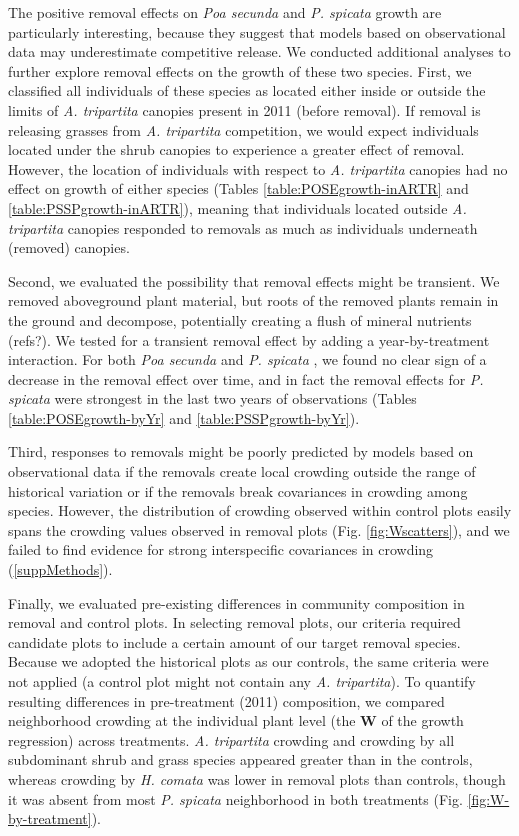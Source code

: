 \documentclass[11pt]{article}
\begin{document}
\begin{doublespacing}
The positive removal effects on \textit{Poa secunda}  and \textit{P. spicata} growth are particularly interesting, because they suggest that models based on observational data may underestimate competitive release. We conducted additional analyses to further explore removal effects on the growth of these two species. First, we classified all individuals of these species as located either inside or outside the limits of \textit{A. tripartita} canopies present in 2011 (before removal). If removal is releasing grasses from \textit{A. tripartita} competition, we would expect individuals located under the shrub canopies to experience a greater effect of removal. However, the location of individuals with respect to \textit{A. tripartita} canopies had no effect on growth of either species (Tables \ref{table:POSEgrowth-inARTR} and \ref{table:PSSPgrowth-inARTR}), meaning that individuals located outside \textit{A. tripartita} canopies responded to removals as much as individuals underneath (removed) canopies. 

Second, we evaluated the possibility that removal effects might be transient. We removed aboveground plant material, but roots of the removed plants remain in the ground and decompose, potentially creating a flush of mineral nutrients (refs?). We tested for a transient removal effect by adding a year-by-treatment interaction. For both  \textit{Poa secunda}  and \textit{P. spicata} , we found no clear sign of a decrease in the removal effect over time, and in fact the removal effects for \textit{P. spicata} were strongest in the last two years of observations (Tables \ref{table:POSEgrowth-byYr} and \ref{table:PSSPgrowth-byYr}).

Third, responses to removals might be poorly predicted by models based on observational data if the removals create local crowding outside the range of historical variation or if the removals break covariances in crowding among species. However, the distribution of crowding observed within control plots easily spans the crowding values observed in removal plots (Fig. \ref{fig:Wscatters}), and we failed to find evidence for strong interspecific covariances in crowding (\ref{suppMethods}).

Finally, we evaluated pre-existing differences in community composition in removal and control plots. In selecting removal plots, our criteria required candidate plots to include a certain amount of our target removal species. Because we adopted the historical plots as our controls, the same criteria were not applied (a control plot might not contain any \textit{A. tripartita}). To quantify resulting differences in pre-treatment (2011) composition, we compared neighborhood crowding at the individual plant level (the $\boldsymbol{W}$ of the growth regression) across treatments. \textit{A. tripartita} crowding and crowding by all subdominant shrub and grass species appeared greater than in the controls, whereas crowding by \textit{H. comata} was lower in removal plots than controls, though it was absent from most \textit{P. spicata} neighborhood in both treatments (Fig. \ref{fig:W-by-treatment}). 


\end{doublespacing}
\end{document}
